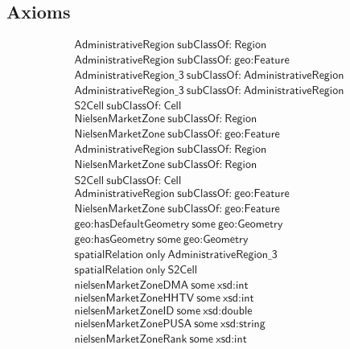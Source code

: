 \subsection{Axioms}
\begin{align}
  \textsf{AdministrativeRegion}~\textsf{subClassOf:}~\textsf{Region}\\
  \textsf{AdministrativeRegion}~\textsf{subClassOf:}~\textsf{geo:Feature}\\
  \textsf{AdministrativeRegion\_3}~\textsf{subClassOf:}~\textsf{AdministrativeRegion}\\
  \textsf{AdministrativeRegion\_3}~\textsf{subClassOf:}~\textsf{AdministrativeRegion}\\
  \textsf{S2Cell}~\textsf{subClassOf:}~\textsf{Cell}\\
  \textsf{NielsenMarketZone}~\textsf{subClassOf:}~\textsf{Region}\\
  \textsf{NielsenMarketZone}~\textsf{subClassOf:}~\textsf{geo:Feature}\\
  \textsf{AdministrativeRegion}~\textsf{subClassOf:}~\textsf{Region}\\
  \textsf{NielsenMarketZone}~\textsf{subClassOf:}~\textsf{Region}\\
  \textsf{S2Cell}~\textsf{subClassOf:}~\textsf{Cell}\\
  \textsf{AdministrativeRegion}~\textsf{subClassOf:}~\textsf{geo:Feature}\\
  \textsf{NielsenMarketZone}~\textsf{subClassOf:}~\textsf{geo:Feature}\\
  \textsf{geo:hasDefaultGeometry}~\textsf{some}~\textsf{geo:Geometry}\\
  \textsf{geo:hasGeometry}~\textsf{some}~\textsf{geo:Geometry}\\
  \textsf{spatialRelation}~\textsf{only}~\textsf{AdministrativeRegion\_3}\\
  \textsf{spatialRelation}~\textsf{only}~\textsf{S2Cell}\\
  \textsf{nielsenMarketZoneDMA}~\textsf{some}~\textsf{xsd:int}\\
  \textsf{nielsenMarketZoneHHTV}~\textsf{some}~\textsf{xsd:int}\\
  \textsf{nielsenMarketZoneID}~\textsf{some}~\textsf{xsd:double}\\
  \textsf{nielsenMarketZonePUSA}~\textsf{some}~\textsf{xsd:string}\\
  \textsf{nielsenMarketZoneRank}~\textsf{some}~\textsf{xsd:int}\end{align}




